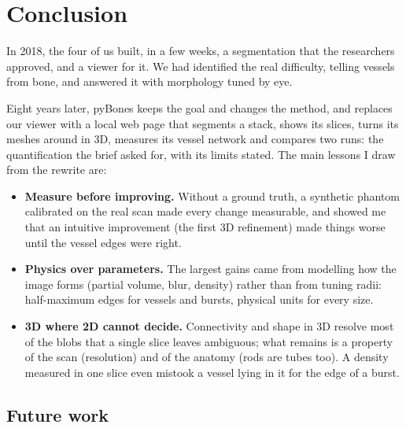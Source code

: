 \chapter{Conclusion}
\label{chap:conclusion}

In 2018, the four of us built, in a few weeks, a segmentation that the researchers approved, and a
viewer for it. We had identified the real difficulty, telling vessels from bone, and answered it with
morphology tuned by eye.

Eight years later, pyBones keeps the goal and changes the method, and replaces our viewer with a local
web page that segments a stack, shows its slices, turns its meshes around in 3D, measures its
vessel network and compares two runs: the quantification the brief asked for, with its limits stated. The main lessons I
draw from the rewrite are:
\begin{itemize}
  \item \textbf{Measure before improving.} Without a ground truth, a synthetic phantom calibrated on the
        real scan made every change measurable, and showed me that an intuitive improvement (the first 3D
        refinement) made things worse until the vessel edges were right.
  \item \textbf{Physics over parameters.} The largest gains came from modelling how the image forms
        (partial volume, blur, density) rather than from tuning radii: half-maximum edges for vessels
        and bursts, physical units for every size.
  \item \textbf{3D where 2D cannot decide.} Connectivity and shape in 3D resolve most of the blobs that a
        single slice leaves ambiguous; what remains is a property of the scan (resolution) and of the
        anatomy (rods are tubes too). A density measured in one slice even mistook a vessel lying in it
        for the edge of a burst.
\end{itemize}

\section*{Future work}


